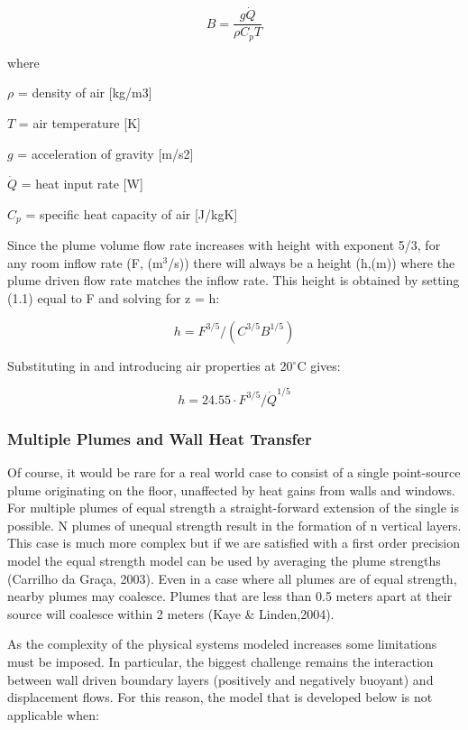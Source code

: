 {\begin{equation}
B = \frac{{g\dot Q}}{{\rho {C_p}T}}
\end{equation}

where

\(\rho\) = density of air {[}kg/m3{]}

\(T\) = air temperature {[}K{]}

\(g\) = acceleration of gravity {[}m/s2{]}

\(\dot Q\) = heat input rate {[}W{]}

\({C_p}\) = specific heat capacity of air {[}J/kgK{]}

Since the plume volume flow rate increases with height with exponent 5/3, for any room inflow rate (F, (m\(^{3}\)/s)) there will always be a height (h,(m)) where the plume driven flow rate matches the inflow rate. This height is obtained by setting (1.1) equal to F and solving for z = h:

\begin{equation}
h = {F^{3/5}}/({C^{3/5}}{B^{1/5}})
\end{equation}

Substituting in and introducing air properties at 20\(^{\circ}\)C gives:

\begin{equation}
h = 24.55\cdot {F^{3/5}}/{\dot Q^{1/5}}
\end{equation}

\subsubsection{Multiple Plumes and Wall Heat Transfer}\label{multiple-plumes-and-wall-heat-transfer}

Of course, it would be rare for a real world case to consist of a single point-source plume originating on the floor, unaffected by heat gains from walls and windows. For multiple plumes of equal strength a straight-forward extension of the single is possible. N plumes of unequal strength result in the formation of n vertical layers. This case is much more complex but if we are satisfied with a first order precision model the equal strength model can be used by averaging the plume strengths (Carrilho da Graça, 2003). Even in a case where all plumes are of equal strength, nearby plumes may coalesce. Plumes that are less than 0.5 meters apart at their source will coalesce within 2 meters (Kaye \& Linden,2004).

As the complexity of the physical systems modeled increases some limitations must be imposed. In particular, the biggest challenge remains the interaction between wall driven boundary layers (positively and negatively buoyant) and displacement flows. For this reason, the model that is developed below is not applicable when:

}
